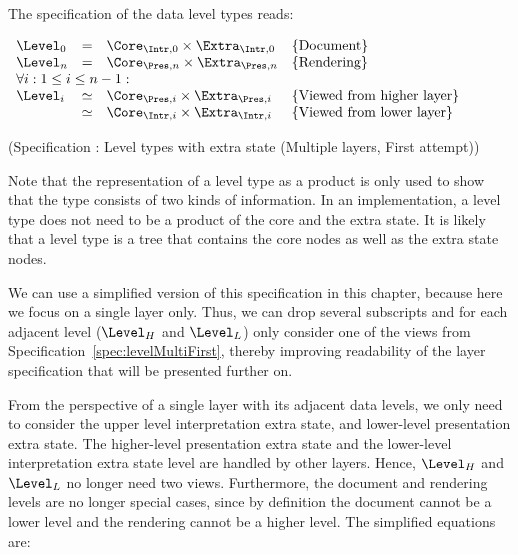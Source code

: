The specification of the data level types reads:

\begin{small}
 \label{spec:levelMultiFirst}
\(\begin{array}{lcll}
\Level_{0} & = & \Core_{\Intr,0} \times \Extra_{\Intr,0}      & \text{\{Document\}}\\
\Level_{n} & = & \Core_{\Pres,n} \times \Extra_{\Pres,n}      & \text{\{Rendering\}}\\
\lefteqn{\forall i:1 \le i \le n-1:}  \\
\Level_{i}  & \simeq & \Core_{\Pres,i} \times \Extra_{\Pres,i}     & \text{\{Viewed from higher layer\}}\\
                & \simeq & \Core_{\Intr,i} \times \Extra_{\Intr,i} &  \text{\{Viewed from lower layer\}}\\
\end{array}\)\end{small}
\begin{center}(Specification \thespecification: Level types with extra state (Multiple layers, First attempt))\end{center}\vspace{1em}



Note that the representation of a level type as a product is only used to show that the type consists of two kinds of information. In an implementation, a level type does not need to be a product of the core and the extra state. It is likely that a level type is a tree that contains the core nodes as well as the extra state nodes.

We can use a simplified version of this specification in this chapter, because here we focus on a single layer only. Thus, we can drop several subscripts and for each adjacent level ($\Level_{H}$ and $\Level_{L}$) only consider one of the views from Specification~\ref{spec:levelMultiFirst}, thereby improving readability of the layer specification that will be presented further on. 

From the perspective of a single layer with its adjacent data levels, we only need to consider the upper level interpretation extra state, and lower-level presentation extra state. The higher-level presentation extra state and the lower-level interpretation extra state level are handled by other layers. Hence, $\Level_{H}$ and $\Level_{L}$ no longer need two views. Furthermore, the document and rendering levels are no longer special cases, since by definition the document cannot be a lower level and the rendering cannot be a higher level. The simplified equations are:

